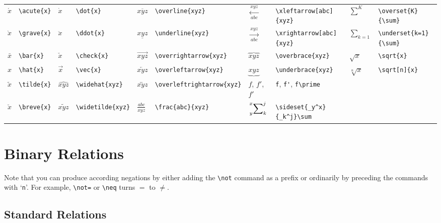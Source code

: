 \documentclass[10pt, english]{article}
\begin{document}
	\begin{center}
		\scriptsize
	\begin{tabular}{ll|ll|ll|ll|ll}
		$\acute{x}$ & \verb|\acute{x}| & $\dot{x}$ & \verb|\dot{x}| & $\overline{xyz}$ & \verb|\overline{xyz}| & $\xleftarrow[abc]{xyz}$ & \verb|\xleftarrow[abc]{xyz}| & $\overset{K}{\sum}$ & \verb|\overset{K}{\sum}| \\
		$\grave{x}$ & \verb|\grave{x}| & $\ddot{x}$ & \verb|\ddot{x}| & $\underline{xyz}$ & \verb|\underline{xyz}| & $\xrightarrow[abc]{xyz}$ & \verb|\xrightarrow[abc]{xyz}| & $\underset{k=1}{\sum}$ & \verb|\underset{k=1}{\sum}| \\
		$\bar{x}$ & \verb|\bar{x}| & $\check{x}$ & \verb|\check{x}| & $\overrightarrow{xyz}$ & \verb|\overrightarrow{xyz}| & $\overbrace{xyz}$ & \verb|\overbrace{xyz}| & $\sqrt{x}$ & \verb|\sqrt{x}| \\
		$\hat{x}$ & \verb|\hat{x}| & $\vec{x}$ & \verb|\vec{x}| & $\overleftarrow{xyz}$ & \verb|\overleftarrow{xyz}| & $\underbrace{xyz}$ & \verb|\underbrace{xyz}| & $\sqrt[n]{x}$ & \verb|\sqrt[n]{x}| \\
		$\tilde{x}$ & \verb|\tilde{x}| & $\widehat{xyz}$ & \verb|\widehat{xyz}| & $\overleftrightarrow{xyz}$ & \verb|\overleftrightarrow{xyz}| & $f$, $f'$, $f\prime$ & \verb|f|, \verb|f'|, \verb|f\prime| \\
		$\breve{x}$ & \verb|\breve{x}| & $\widetilde{xyz}$ & \verb|\widetilde{xyz}| & $\frac{abc}{xyz}$ & \verb|\frac{abc}{xyz}| & $\sideset{_y^x}{_k^j}\sum$ & \verb|\sideset{_y^x}{_k^j}\sum| \\
	\end{tabular}
	\end{center}

	\newpage

\section{Binary Relations}

	Note that you can produce according negations by either adding the \verb|\not| command as a prefix or ordinarily by preceding the commands with `\verb|n|'. For example, \verb|\not=| or \verb|\neq| turns $=$ to $\neq$.

	\subsection{Standard Relations}
\end{document}
